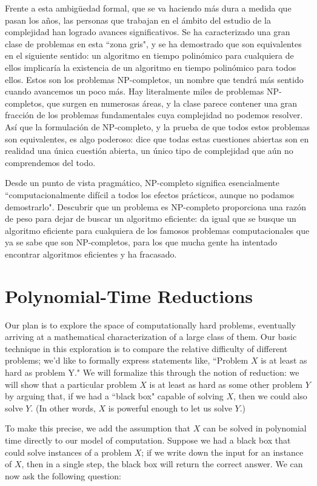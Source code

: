 \documentclass[a4paper, 12pt]{book}
\theoremstyle{dotless}
\begin{document}
Frente a esta ambigüedad formal, que se va haciendo más dura a medida que pasan los años, las personas que trabajan en el ámbito del estudio de la complejidad han logrado avances significativos. Se ha caracterizado una gran clase de problemas en esta ``zona gris", y se ha demostrado que son equivalentes en el siguiente sentido: un algoritmo en tiempo polinómico para cualquiera de ellos implicaría la existencia de un algoritmo en tiempo polinómico para todos ellos. Estos son los problemas NP-completos, un nombre que tendrá más sentido cuando avancemos un poco más. Hay literalmente miles de problemas NP-completos, que surgen en numerosas áreas, y la clase parece contener una gran fracción de los problemas fundamentales cuya complejidad no podemos resolver. Así que la formulación de NP-completo, y la prueba de que todos estos problemas son equivalentes, es algo poderoso: dice que todas estas cuestiones abiertas son en realidad una única cuestión abierta, un único tipo de complejidad que aún no comprendemos del todo.

Desde un punto de vista pragmático, NP-completo significa esencialmente ``computacionalmente difícil a todos los efectos prácticos, aunque no podamos demostrarlo". Descubrir que un problema es NP-completo proporciona una razón de peso para dejar de buscar un algoritmo eficiente: da igual que se busque un algoritmo eficiente para cualquiera de los famosos problemas computacionales que ya se sabe que son NP-completos, para los que mucha gente ha intentado encontrar algoritmos eficientes y ha fracasado.

\section{Polynomial-Time Reductions}
Our plan is to explore the space of computationally hard problems, eventually arriving at a mathematical characterization of a large class of them. Our basic technique in this exploration is to compare the relative difficulty of different problems; we'd like to formally express statements like, ``Problem $X$ is at least as hard as problem Y." We will formalize this through the notion of reduction: we will show that a particular problem $X$ is at least as hard as some other problem $Y$ by arguing that, if we had a ``black box" capable of solving $X$, then we could also solve $Y$. (In other words, $X$ is powerful enough to let us solve $Y$.)

To make this precise, we add the assumption that $X$ can be solved in polynomial time directly to our model of computation. Suppose we had a black box that could solve instances of a problem $X$; if we write down the input for an instance of $X$, then in a single step, the black box will return the correct answer. We can now ask the following question:
\end{document}
